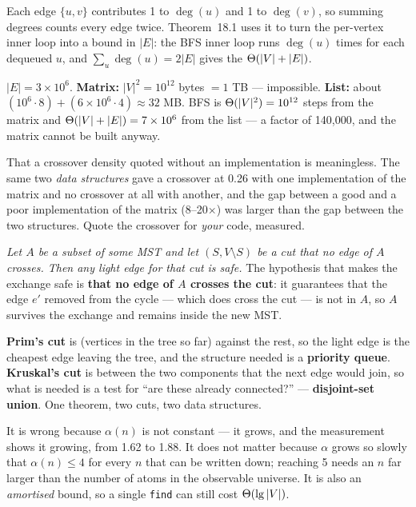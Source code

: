 \begin{ans}
  \item Each edge $\{u,v\}$ contributes 1 to $\deg(u)$ and 1 to $\deg(v)$, so
        summing degrees counts every edge twice. Theorem~18.1 uses it to turn
        the per-vertex inner loop into a bound in $|E|$: the BFS inner loop
        runs $\deg(u)$ times for each dequeued $u$, and
        $\sum_{u}\deg(u) = 2|E|$ gives the $\Theta(|V|+|E|)$.
  \item $|E| = 3 \times 10^{6}$. \textbf{Matrix:} $|V|^{2} = 10^{12}$ bytes
        $= 1$ TB --- impossible. \textbf{List:} about
        $(10^{6} \cdot 8) + (6 \times 10^{6} \cdot 4) \approx 32$ MB. BFS is
        $\Theta(|V|^{2}) = 10^{12}$ steps from the matrix and
        $\Theta(|V|+|E|) = 7 \times 10^{6}$ from the list --- a factor of
        140{,}000, and the matrix cannot be built anyway.
  \item That a crossover density quoted without an implementation is
        meaningless. The same two \emph{data structures} gave a crossover at
        0.26 with one implementation of the matrix and no crossover at all with
        another, and the gap between a good and a poor implementation of the
        matrix (8--20$\times$) was larger than the gap between the two
        structures. Quote the crossover for \emph{your} code, measured.
\end{ans}

\begin{ans}
  \item \emph{Let $A$ be a subset of some MST and let $(S, V\setminus S)$ be a
        cut that no edge of $A$ crosses. Then any light edge for that cut is
        safe.} The hypothesis that makes the exchange safe is \textbf{that no
        edge of $A$ crosses the cut}: it guarantees that the edge $e'$ removed
        from the cycle --- which does cross the cut --- is not in $A$, so
        $A$ survives the exchange and remains inside the new MST.
  \item \textbf{Prim's cut} is (vertices in the tree so far) against the rest,
        so the light edge is the cheapest edge leaving the tree, and the
        structure needed is a \textbf{priority queue}. \textbf{Kruskal's cut}
        is between the two components that the next edge would join, so what is
        needed is a test for ``are these already connected?'' ---
        \textbf{disjoint-set union}. One theorem, two cuts, two data
        structures.
  \item It is wrong because $\alpha(n)$ is not constant --- it grows, and the
        measurement shows it growing, from 1.62 to 1.88. It does not matter
        because $\alpha$ grows so slowly that $\alpha(n) \le 4$ for every $n$
        that can be written down; reaching 5 needs an $n$ far larger than the
        number of atoms in the observable universe. It is also an
        \emph{amortised} bound, so a single \texttt{find} can still cost
        $\Theta(\operatorname{lg}|V|)$.
\end{ans}

